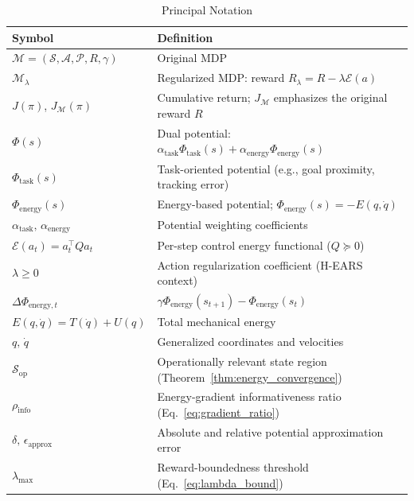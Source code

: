 \documentclass[journal]{IEEEtran}
\begin{document}
	\begin{table}[!t]
		\captionsetup{font=footnotesize, labelfont=footnotesize}
		\caption{Principal Notation}
		\label{tab:notation}
		\centering
		\footnotesize
		\begin{tabular}{ll}
			\toprule
			\textbf{Symbol} & \textbf{Definition} \\
			\midrule
			$\mathcal{M}=(\mathcal{S},\mathcal{A},\mathcal{P},R,\gamma)$ & Original MDP \\
			$\mathcal{M}_\lambda$ & Regularized MDP: reward $R_\lambda = R - \lambda\mathcal{E}(a)$ \\
			$J(\pi)$, $J_{\mathcal{M}}(\pi)$ & Cumulative return; $J_{\mathcal{M}}$ emphasizes the original reward $R$ \\
			$\Phi(s)$ & Dual potential: $\alpha_{\text{task}}\Phi_{\text{task}}(s)+\alpha_{\text{energy}}\Phi_{\text{energy}}(s)$ \\
			$\Phi_{\text{task}}(s)$ & Task-oriented potential (e.g., goal proximity, tracking error) \\
			$\Phi_{\text{energy}}(s)$ & Energy-based potential; $\Phi_{\text{energy}}(s) = -E(q,\dot{q})$ \\
			$\alpha_{\text{task}},\,\alpha_{\text{energy}}$ & Potential weighting coefficients \\
			$\mathcal{E}(a_t) = a_t^\top Q a_t$ & Per-step control energy functional ($Q \succeq 0$) \\
			$\lambda \geq 0$ & Action regularization coefficient (H-EARS context) \\
			$\Delta\Phi_{\text{energy},t}$ & $\gamma\Phi_{\text{energy}}(s_{t+1}) - \Phi_{\text{energy}}(s_t)$ \\
			$E(q,\dot{q}) = T(\dot{q})+U(q)$ & Total mechanical energy \\
			$q,\,\dot{q}$ & Generalized coordinates and velocities \\
			$\mathcal{S}_{\text{op}}$ & Operationally relevant state region (Theorem~\ref{thm:energy_convergence}) \\
			$\rho_{\text{info}}$ & Energy-gradient informativeness ratio (Eq.~\ref{eq:gradient_ratio}) \\
			$\delta,\,\epsilon_{\text{approx}}$ & Absolute and relative potential approximation error \\
			$\lambda_{\max}$ & Reward-boundedness threshold (Eq.~\ref{eq:lambda_bound}) \\
			\bottomrule
		\end{tabular}
	\end{table}
	
\end{document}
